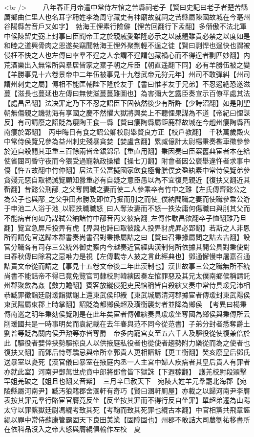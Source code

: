 <br />
　　八年春正月帝遣中常侍左悺之苦縣祠老子【賢曰史記曰老子者楚苦縣厲鄉曲仁里人也名耳字耼姓李為周守藏史有神廟故就祠之苦縣屬陳國故城在今亳州谷陽縣苦音戶又如字】　勃海王悝素行險僻【悝苦回翻行下孟翻】多僭傲不法北軍中候陳留史弼上封事曰臣聞帝王之於親戚愛雖隆必示之以威體雖貴必禁之以度如是和睦之道興骨肉之恩遂矣竊聞勃海王悝外聚剽輕不逞之徒【賢曰剽悍也逞快也謂被侵枉不快之人也左傳曰率羣不逞之人余謂不逞謂包藏禍心而不得逞者剽匹妙翻】内荒酒樂出入無常所與羣居皆家之棄子朝之斥臣【朝直遥翻下同】必有羊勝伍被之變【羊勝事見十六卷景帝中二年伍被事見十九卷武帝元狩元年】州司不敢彈糾【州司謂州刺史之屬】傅相不能匡輔陛下隆於友于【書曰惟孝友于兄弟】不忍遏絶恐遂滋蔓【滋長也蔓延也左傳曰無使滋蔓蔓難圖也】為害彌大乞露臣奏宣示百僚平處其法【處昌呂翻】法决罪定乃下不忍之詔臣下固執然後少有所許【少詩沼翻】如是則聖朝無傷親之譏勃海有享國之慶不然懼大獄將興矣上不聽悝果謀為不道【帝紀曰悝謀反】有司請廢之詔貶為癭陶王食一縣【賢曰癭陶縣屬鉅鹿郡故城在今趙州癭陶縣西南癭於郢翻】　丙申晦日有食之詔公卿校尉舉賢良方正【校戶教翻】　千秋萬歲殿火　中常侍侯覽兄參為益州刺史殘暴貪婪【婪盧含翻】累臧億計太尉楊秉奏檻車徵參參於道自殺閱其車重三百餘兩皆金銀錦帛【重直用翻】秉因奏曰臣案舊典宦者本在給使省闥司昏守夜而今猥受過寵執政操權【操七刀翻】附會者因公襃舉違忤者求事中傷【忤五故翻中竹仲翻】居法王公富擬國家飲食極肴膳僕妾盈紈素中常侍侯覽弟參貪殘元惡自取禍滅覽顧知釁重必有自疑之意臣愚以為不宜復見親近【復扶又翻近其靳翻】昔懿公刑邴之父奪閻職之妻而使二人參乘卒有竹中之難【左氏傳齊懿公之為公子也與邴之父爭田弗勝及即位乃掘而刖之而使僕納閻職之妻而使職參乘公游于申池二人浴于池以鞭抶職職怒曰人奪汝妻而不怒一抶汝庸何傷職曰與刖其父而不能病者何如乃謀弑公納諸竹中邴音丙又彼病翻左傳作歜昌欲翻卒子恤翻難乃旦翻】覽宜急屏斥投畀有虎【畀與也詩曰取彼讒人投畀豺虎屛必郢翻】若斯之人非恩所宥請免官送歸本郡書奏尚書召對秉掾屬詰之曰【賢曰召秉掾屬問之詰去吉翻】設官分職各有司存三公統外御史察内今越奏近官經典漢制何所依據其開公具對秉使對曰春秋傳曰除君之惡唯力是視【左傳載寺人披之言此經典也】鄧通懈慢申屠嘉召通詰責文帝從而請之【事見十五卷文帝後二年此漢制也】漢世故事三公之職無所不統尚書不能詰帝不得已竟免覽官司隸校尉韓縯因奏左悺罪惡及其兄太僕南鄉侯稱請託州郡聚斂為姦【斂力贍翻】賓客放縱侵犯吏民悺稱皆自殺縯又奏中常侍具瑗兄沛相恭臧罪徵詣廷尉瑗詣獄謝上還東武侯印綬【東武城屬清河郡據宦者傳瑗封東武陽侯東武陽屬東郡上時掌翻】詔貶為都鄉侯超及璜衡襲封者並降為鄉侯　【考異曰楊秉傳南巡之明年秉劾侯覽則是在此年矣宦者傳韓縯奏具瑗瑗坐奪國為鄉侯與秉傳所云削瑗國共是一時事明矣而袁紀載在去年春與范不同今從范書】子弟分封者悉奪爵土劉普等貶為關内侯尹勲等亦皆奪爵　帝多内寵宫女至五六千人及驅役從使復兼倍於此【驅役者嬖倖挾勢驅掠良人以供掖庭私役者也從使者趨勢附力樂從而為之使者也復扶又翻】而鄧后恃尊驕忌與帝所幸郭貴人更相譖訴【更工衡翻】癸亥廢皇后鄧氏送暴室以憂死【漢官儀曰暴室在掖庭内丞一人主宮中婦人疾病者其皇后貴人有罪者亦就此室】河南尹鄧萬世虎賁中郎將鄧會皆下獄誅【下遐稼翻】　護羌校尉段熲擊罕姐羌破之【姐且也翻又音紫】　三月辛巳赦天下　宛陵大姓羊元羣罷北海郡【宛陵縣屬河南尹】臧汚狼籍郡舍溷軒有奇巧【賢曰溷軒厠屋】亦載之以歸河南尹李膺表按其罪元羣行賂宦官膺竟反坐【反坐按其罪而不得行反自坐罪】單超弟遷為山陽太守以罪繫獄廷尉馮緄考致其死【考鞠而致其死罪也緄古本翻】中官相黨共飛章誣緄以罪中常侍蘇康管霸固天下良田美業【固障固也】州郡不敢詰大司農劉祐移書所在依科品沒入之帝大怒與膺緄俱輸作左校　夏